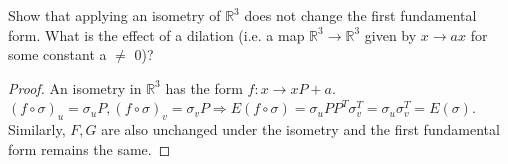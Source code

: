 \begin{problem}
Show that applying an isometry of $\mathbb{R}^3$ does not change the first fundamental form. 
What is the effect of a dilation (i.e. a map $\mathbb{R}^3 \to \mathbb{R}^3$ given by $x\to ax$
for some constant a $\neq$ 0)?
\end{problem}
\begin{solution}
\begin{proof}
An isometry in $\mathbb{R}^3$ has the form $f:x\to xP+a$. $(f\circ \sigma)_u =\sigma_u P,(f\circ \sigma)_v =\sigma_v P \Rightarrow E(f\circ\sigma) = \sigma_u PP^T\sigma_v^T =\sigma_u \sigma_v^T=E(\sigma)$. Similarly, $F,G$ are also unchanged under the isometry and the first fundamental form remains the same.
\end{proof}
\end{solution}

